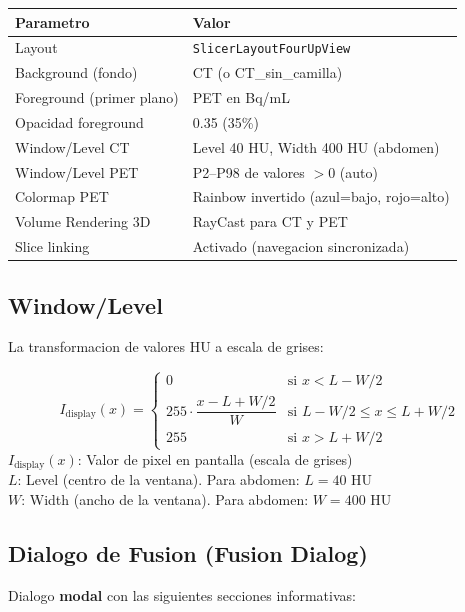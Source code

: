 \documentclass[12pt,a4paper]{article}
\newcommand{\vardef}[2]{\noindent\textbf{#1}: #2\\}
\begin{document}
\begin{table}[H]
\centering
\begin{tabular}{l l}
\toprule
\textbf{Parametro} & \textbf{Valor} \\
\midrule
Layout & \texttt{SlicerLayoutFourUpView} \\
Background (fondo) & CT (o CT\_sin\_camilla) \\
Foreground (primer plano) & PET en Bq/mL \\
Opacidad foreground & 0.35 (35\%) \\
Window/Level CT & Level 40 HU, Width 400 HU (abdomen) \\
Window/Level PET & P2--P98 de valores $>0$ (auto) \\
Colormap PET & Rainbow invertido (azul=bajo, rojo=alto) \\
Volume Rendering 3D & RayCast para CT y PET \\
Slice linking & Activado (navegacion sincronizada) \\
\bottomrule
\end{tabular}
\end{table}

\subsection{Window/Level}

La transformacion de valores HU a escala de grises:

\begin{equation}\label{eq:window_level}
    I_{\text{display}}(x) = \begin{cases}
        0 & \text{si } x < L - W/2 \\
        255 \cdot \dfrac{x - L + W/2}{W} & \text{si } L - W/2 \leq x \leq L + W/2 \\
        255 & \text{si } x > L + W/2
    \end{cases}
\end{equation}
\vardef{$I_{\text{display}}(x)$}{Valor de pixel en pantalla (escala de grises)}
\vardef{$L$}{Level (centro de la ventana). Para abdomen: $L=40$ HU}
\vardef{$W$}{Width (ancho de la ventana). Para abdomen: $W=400$ HU}

\subsection{Dialogo de Fusion (Fusion Dialog)}

Dialogo \textbf{modal} con las siguientes secciones informativas:
\end{document}
